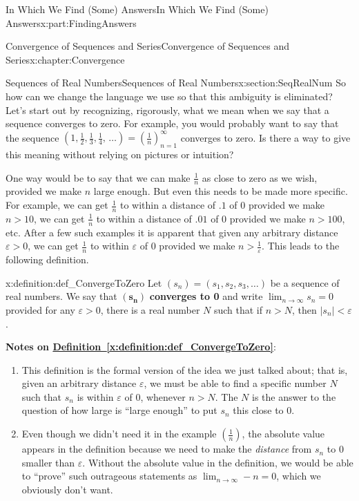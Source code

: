 \documentclass[oneside,10pt,]{book}
\newcommand{\xreffont}{\relax}
\newcommand{\terminology}[1]{\textbf{#1}}
\numberwithin{equation}{section}
\newcommand{\eps}{\varepsilon}
\newcommand{\lt}{<}
\begin{document}
\begin{partptx}{In Which We Find (Some) Answers}{}{In Which We Find (Some) Answers}{}{}{x:part:FindingAnswers}
\begin{chapterptx}{Convergence of Sequences and Series}{}{Convergence of Sequences and Series}{}{}{x:chapter:Convergence}
\begin{sectionptx}{Sequences of Real Numbers}{}{Sequences of Real Numbers}{}{}{x:section:SeqRealNum}
So how can we change the language we use so that this ambiguity is eliminated? Let's start out by recognizing, rigorously, what we mean when we say that a sequence converges to zero. For example, you would probably want to say that the sequence \(\left(1,\frac{1}{2},\frac{1}{3},\frac{1}{4},\,\ldots\right)=\left( \frac{1}{n}\right)_{n=1}^\infty\) converges to zero. Is there a way to give this meaning without relying on pictures or intuition?%
\par
One way would be to say that we can make \(\frac{1}{n}\) as close to zero as we wish, provided we make \(n\) large enough. But even this needs to be made more specific. For example, we can get \(\frac{1}{n}\) to within a distance of \(.1\) of \(0\) provided we make \(n>10\), we can get \(\frac{1}{n}\) to within a distance of \(.01\) of \(0\) provided we make \(n>100\), etc. After a few such examples it is apparent that given any arbitrary distance \(\eps>0\), we can get \(\frac{1}{n}\) to within \(\eps\) of \(0\) provided we make \(n>\frac{1}{\eps}\). This leads to the following definition.%
\begin{definition}{}{x:definition:def_ConvergeToZero}%
 Let \(\left(s_n\right)=\left(s_1,s_2,s_3,\ldots\right)\) be a sequence of real numbers. We say that \(\left(\boldsymbol{s}_{\boldsymbol{n}}\right)\) \terminology{converges to 0} and write \(\lim_{n\rightarrow\infty}s_n=0\) provided for any \(\eps>0\), there is a real number \(N\) such that if \(n>N\), then \(|s_n|\lt \eps\).%
\end{definition}
\terminology{Notes on \hyperref[x:definition:def_ConvergeToZero]{Definition~{\xreffont\ref{x:definition:def_ConvergeToZero}}}}:%
\begin{enumerate}
\item{}This definition is the formal version of the idea we just talked about; that is, given an arbitrary distance \(\eps\), we must be able to find a specific number \(N\) such that \(s_n\) is within \(\eps\) of \(0\), whenever \(n>N\). The \(N\) is the answer to the question of how large is ``large enough'' to put \(s_n\) this close to \(0\).%
\item{}Even though we didn't need it in the example \(\left(\frac{1}{n}\right)\), the absolute value appears in the definition because we need to make the \emph{distance} from \(s_n\) to 0 smaller than \(\eps\). Without the absolute value in the definition, we would be able to ``prove'' such outrageous statements as \(\lim_{n\rightarrow\infty}-n=0\), which we obviously don't want.%

\end{enumerate}
\end{sectionptx}
\end{chapterptx}
\end{partptx}
\end{document}
